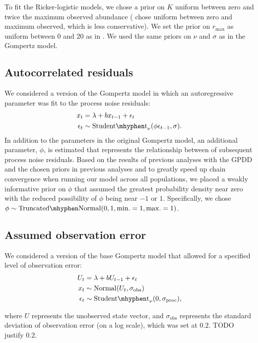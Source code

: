 \documentclass[12pt]{article}
\begin{document}
To fit the Ricker-logistic models, we chose a prior on $K$ uniform between zero and twice the maximum observed abundance (\citet{clark2010} chose uniform between zero and maximum observed, which is less conservative). We set the prior on $r_\mathrm{max}$ as uniform between 0 and 20 as in \citet{clark2010}. We used the same priors on $\nu$ and $\sigma$ as in the Gompertz model.

\subsection{Autocorrelated residuals}

We considered a version of the Gompertz model in which an autoregressive parameter was fit to the process noise residuals:
\begin{align*}
x_t &= \lambda + b x_{t-1} + \epsilon_t\\
\epsilon_t &\sim \mathrm{Student\mhyphen t}_\nu(\phi \epsilon_{t-1}, \sigma).
\end{align*}
\noindent
In addition to the parameters in the original Gompertz model, an additional parameter, $\phi$, is estimated that represents the relationship between of subsequent process noise residuals. Based on the results of previous analyses with the GPDD \citep[e.g.][]{connors2014} and the chosen priors in previous analyses \citep[e.g.][]{thorson2014a} and to greatly speed up chain convergence when running our model across all populations, we placed a weakly informative prior on $\phi$ that assumed the greatest probability density near zero with the reduced possibility of $\phi$ being near $-1$ or $1$. Specifically, we chose $\phi \sim \mathrm{Truncated\mhyphen Normal}(0, 1, \mathrm{min.} = 1, \mathrm{max.} = 1)$.

\subsection{Assumed observation error}

We considered a version of the base Gompertz model that allowed for a specified level of observation error:
\begin{align*}
U_t &= \lambda + b U_{t-1} + \epsilon_t\\
x_t &\sim \mathrm{Normal}(U_t, \sigma_\mathrm{obs})\\
\epsilon_t &\sim \mathrm{Student\mhyphen t}_\nu(0, \sigma_\mathrm{proc}),
\end{align*}

\noindent
where $U$ represents the unobserved state vector, and $\sigma_\mathrm{obs}$ represents the standard deviation of observation error (on a log scale), which was set at $0.2$. TODO justify $0.2$.
\end{document}

